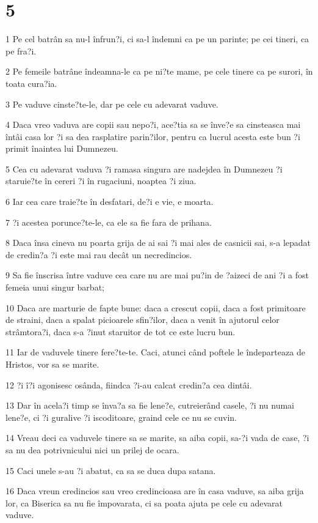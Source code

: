 \chapter{5}

\par 1 Pe cel batrân sa nu-l înfrun?i, ci sa-l îndemni ca pe un parinte; pe cei tineri, ca pe fra?i.
\par 2 Pe femeile batrâne îndeamna-le ca pe ni?te mame, pe cele tinere ca pe surori, în toata cura?ia.
\par 3 Pe vaduve cinste?te-le, dar pe cele cu adevarat vaduve.
\par 4 Daca vreo vaduva are copii sau nepo?i, ace?tia sa se înve?e sa cinsteasca mai întâi casa lor ?i sa dea rasplatire parin?ilor, pentru ca lucrul acesta este bun ?i primit înaintea lui Dumnezeu.
\par 5 Cea cu adevarat vaduva ?i ramasa singura are nadejdea în Dumnezeu ?i staruie?te în cereri ?i în rugaciuni, noaptea ?i ziua.
\par 6 Iar cea care traie?te în desfatari, de?i e vie, e moarta.
\par 7 ?i acestea porunce?te-le, ca ele sa fie fara de prihana.
\par 8 Daca însa cineva nu poarta grija de ai sai ?i mai ales de casnicii sai, s-a lepadat de credin?a ?i este mai rau decât un necredincios.
\par 9 Sa fie înscrisa între vaduve cea care nu are mai pu?in de ?aizeci de ani ?i a fost femeia unui singur barbat;
\par 10 Daca are marturie de fapte bune: daca a crescut copii, daca a fost primitoare de straini, daca a spalat picioarele sfin?ilor, daca a venit în ajutorul celor strâmtora?i, daca s-a ?inut staruitor de tot ce este lucru bun.
\par 11 Iar de vaduvele tinere fere?te-te. Caci, atunci când poftele le îndeparteaza de Hristos, vor sa se marite.
\par 12 ?i î?i agonisesc osânda, fiindca ?i-au calcat credin?a cea dintâi.
\par 13 Dar în acela?i timp se înva?a sa fie lene?e, cutreierând casele, ?i nu numai lene?e, ci ?i guralive ?i iscoditoare, graind cele ce nu se cuvin.
\par 14 Vreau deci ca vaduvele tinere sa se marite, sa aiba copii, sa-?i vada de case, ?i sa nu dea potrivnicului nici un prilej de ocara.
\par 15 Caci unele s-au ?i abatut, ca sa se duca dupa satana.
\par 16 Daca vreun credincios sau vreo credincioasa are în casa vaduve, sa aiba grija lor, ca Biserica sa nu fie împovarata, ci sa poata ajuta pe cele cu adevarat vaduve.
